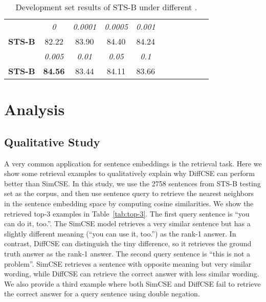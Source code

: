 \documentclass[11pt]{article}
\begin{document}
\begin{table}[t]
    \begin{center}
    \centering
    \small
    \begin{tabular}{lcccccccccc}
    \toprule
        \bf  & \it 0 & \it 0.0001 & \it 0.0005 & \it 0.001  \\ 
        \bf STS-B & 82.22 & 83.90 & 84.40 & 84.24  \\
    \midrule
        \bf  & \it 0.005 & \it 0.01 & \it 0.05 & \it 0.1 \\
        \bf STS-B & \bf 84.56 & 83.44 & 84.11 & 83.66 \\
    \bottomrule
    \end{tabular}
    \end{center}
    \vspace{-3mm}
    \caption{
        Development set results of STS-B under different .
    }
    \label{tab:lambda}
    \vspace{-1mm}
\end{table}


\section{Analysis}
\subsection{Qualitative Study}
A very common application for sentence embeddings is the retrieval task. Here we show some retrieval examples to qualitatively explain why DiffCSE can perform better than SimCSE. In this study, we use the 2758 sentences from STS-B testing set as the corpus, and then use sentence query to retrieve the nearest neighbors in the sentence embedding space by computing cosine similarities. We show the retrieved top-3 examples in Table~\ref{tab:top-3}. The first query sentence is ``you can do it, too.''. The SimCSE model retrieves a very similar sentence but has a slightly different meaning (``you can use it, too.'') as the rank-1 answer. In contrast, DiffCSE can distinguish the tiny difference, so it retrieves the ground truth answer as the rank-1 answer. The second query sentence is ``this is not a problem''. SimCSE retrieves a sentence with opposite meaning but very similar wording, while DiffCSE can retrieve the correct answer with less similar wording.
We also provide a third example where both SimCSE and DiffCSE fail to retrieve the correct answer for a query sentence using double negation.
\end{document}
